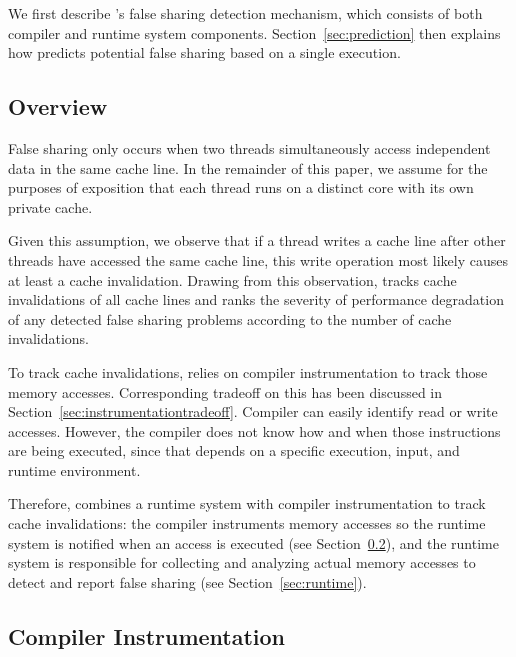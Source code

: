 \label{sec:detection}

We first describe \Predator{}'s false sharing detection mechanism,
which consists of both compiler and runtime system
components. Section~\ref{sec:prediction} then explains how \Predator{}
predicts potential false sharing based on a single execution.

\subsection{Overview}
\label{sec:overview}
False sharing only occurs when two threads
simultaneously access independent data in the same cache line.
In the remainder of this paper, we assume for the purposes of exposition that each thread runs on a 
distinct core with its own private cache.

Given this assumption, we observe that 
if a thread writes a cache line after other threads have 
accessed the same cache line, this write operation most likely causes at least a cache invalidation. Drawing from this observation, \Predator{} tracks cache invalidations of all 
cache lines and ranks the severity of performance degradation of any detected false sharing problems according to the number of cache invalidations. 
 
To track cache invalidations, \Predator{} relies on compiler instrumentation to track those memory accesses. Corresponding tradeoff on this has been discussed in Section~\ref{sec:instrumentationtradeoff}. Compiler can easily identify read or write accesses. However, the compiler does not know how and when those instructions are being executed, since that depends on a specific execution, input, and runtime environment.

Therefore, \Predator{} combines a runtime system with compiler
instrumentation to track cache invalidations: the compiler
instruments memory accesses so the runtime system is notified when an
access is executed (see Section~\ref{sec:compiler}), and the runtime
system is responsible for collecting and analyzing actual memory
accesses to detect and report false sharing (see Section~\ref{sec:runtime}).

\subsection{Compiler Instrumentation}
\label{sec:compiler}

